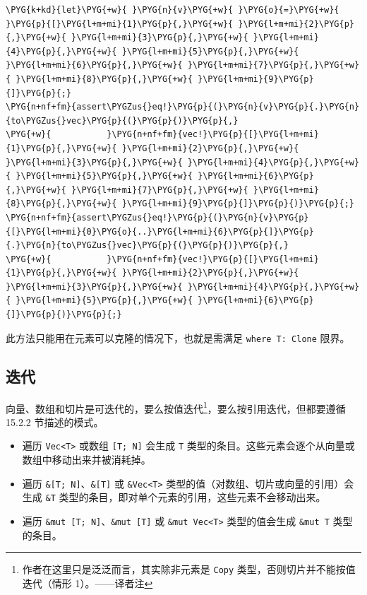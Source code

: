 \begin{Verbatim}[commandchars=\\\{\},breaklines=true,breakanywhere=true,fontsize=\codefont,xleftmargin=17bp]
\PYG{k+kd}{let}\PYG{+w}{ }\PYG{n}{v}\PYG{+w}{ }\PYG{o}{=}\PYG{+w}{ }\PYG{p}{[}\PYG{l+m+mi}{1}\PYG{p}{,}\PYG{+w}{ }\PYG{l+m+mi}{2}\PYG{p}{,}\PYG{+w}{ }\PYG{l+m+mi}{3}\PYG{p}{,}\PYG{+w}{ }\PYG{l+m+mi}{4}\PYG{p}{,}\PYG{+w}{ }\PYG{l+m+mi}{5}\PYG{p}{,}\PYG{+w}{ }\PYG{l+m+mi}{6}\PYG{p}{,}\PYG{+w}{ }\PYG{l+m+mi}{7}\PYG{p}{,}\PYG{+w}{ }\PYG{l+m+mi}{8}\PYG{p}{,}\PYG{+w}{ }\PYG{l+m+mi}{9}\PYG{p}{]}\PYG{p}{;}
\PYG{n+nf+fm}{assert\PYGZus{}eq!}\PYG{p}{(}\PYG{n}{v}\PYG{p}{.}\PYG{n}{to\PYGZus{}vec}\PYG{p}{(}\PYG{p}{)}\PYG{p}{,}
\PYG{+w}{           }\PYG{n+nf+fm}{vec!}\PYG{p}{[}\PYG{l+m+mi}{1}\PYG{p}{,}\PYG{+w}{ }\PYG{l+m+mi}{2}\PYG{p}{,}\PYG{+w}{ }\PYG{l+m+mi}{3}\PYG{p}{,}\PYG{+w}{ }\PYG{l+m+mi}{4}\PYG{p}{,}\PYG{+w}{ }\PYG{l+m+mi}{5}\PYG{p}{,}\PYG{+w}{ }\PYG{l+m+mi}{6}\PYG{p}{,}\PYG{+w}{ }\PYG{l+m+mi}{7}\PYG{p}{,}\PYG{+w}{ }\PYG{l+m+mi}{8}\PYG{p}{,}\PYG{+w}{ }\PYG{l+m+mi}{9}\PYG{p}{]}\PYG{p}{)}\PYG{p}{;}
\PYG{n+nf+fm}{assert\PYGZus{}eq!}\PYG{p}{(}\PYG{n}{v}\PYG{p}{[}\PYG{l+m+mi}{0}\PYG{o}{..}\PYG{l+m+mi}{6}\PYG{p}{]}\PYG{p}{.}\PYG{n}{to\PYGZus{}vec}\PYG{p}{(}\PYG{p}{)}\PYG{p}{,}
\PYG{+w}{           }\PYG{n+nf+fm}{vec!}\PYG{p}{[}\PYG{l+m+mi}{1}\PYG{p}{,}\PYG{+w}{ }\PYG{l+m+mi}{2}\PYG{p}{,}\PYG{+w}{ }\PYG{l+m+mi}{3}\PYG{p}{,}\PYG{+w}{ }\PYG{l+m+mi}{4}\PYG{p}{,}\PYG{+w}{ }\PYG{l+m+mi}{5}\PYG{p}{,}\PYG{+w}{ }\PYG{l+m+mi}{6}\PYG{p}{]}\PYG{p}{)}\PYG{p}{;}
\end{Verbatim}

此方法只能用在元素可以克隆的情况下，也就是需满足 \texttt{where T: Clone} 限界。

\subsection{迭代}

向量、数组和切片是可迭代的，要么按值迭代\footnote{作者在这里只是泛泛而言，其实除非元素是 \texttt{Copy} 类型，否则切片并不能按值迭代（情形 1）。——译者注}，要么按引用迭代，但都要遵循 15.2.2 节描述的模式。

\begin{itemize}
\item 遍历 \texttt{Vec<T>} 或数组 \texttt{[T; N]} 会生成 \texttt{T} 类型的条目。这些元素会逐个从向量或数组中移动出来并被消耗掉。
\item 遍历 \texttt{\&[T; N]}、\texttt{\&[T]} 或 \texttt{\&Vec<T>} 类型的值（对数组、切片或向量的引用）会生成 \texttt{\&T} 类型的条目，即对单个元素的引用，这些元素不会移动出来。
\item 遍历 \texttt{\&mut [T; N]}、\texttt{\&mut [T]} 或 \texttt{\&mut Vec<T>} 类型的值会生成 \texttt{\&mut T} 类型的条目。
\end{itemize}

